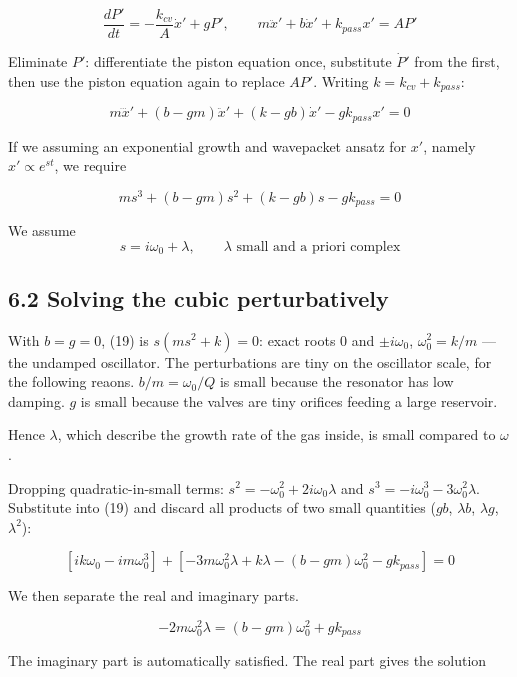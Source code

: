 \documentclass[11pt]{article}
\begin{document}
\begin{equation}
\frac{dP'}{dt} = -\frac{k_{cv}}{A}\dot x' + gP', \qquad m\ddot x' + b\dot x' + k_{pass}x' = AP' \tag{18}
\end{equation}

Eliminate $P'$: differentiate the piston equation once, substitute $\dot P'$ from the first, then use the piston equation again to replace $AP'$. Writing $k = k_{cv}+k_{pass}$:

\[
m\dddot x' + (b - gm)\ddot x' + (k - gb)\dot x' - gk_{pass}x' = 0
\]

If we assuming an exponential growth and wavepacket ansatz for $x'$, namely $x' \propto e^{st}$, we require

\begin{equation}
ms^3 + (b - gm)s^2 + (k - gb)s - gk_{pass} = 0 \tag{19}
\end{equation}

We assume
\[
s = i\omega_0 + \lambda, \qquad \lambda \text{ small and a priori complex}
\]

\subsection*{6.2 Solving the cubic perturbatively}

With $b = g = 0$, (19) is $s(ms^2 + k) = 0$: exact roots $0$ and $\pm i\omega_0$, $\omega_0^2 = k/m$ --- the undamped oscillator. The perturbations are tiny on the oscillator scale, for the following reaons. $b/m = \omega_0/Q$ is small because the resonator has low damping. $g$ is small because the valves are tiny orifices feeding a large reservoir.

Hence $\lambda$, which describe the growth rate of the gas inside, is small compared to $\omega$.

Dropping quadratic-in-small terms: $s^2 = -\omega_0^2 + 2i\omega_0\lambda$ and $s^3 = -i\omega_0^3 - 3\omega_0^2\lambda$. Substitute into (19) and discard all products of two small quantities ($gb$, $\lambda b$, $\lambda g$, $\lambda^2$):

\[
\left[ik\omega_0 - im\omega_0^3\right] + \left[-3m\omega_0^2\lambda + k\lambda - (b - gm)\omega_0^2 - gk_{pass}\right] = 0
\]

We then separate the real and imaginary parts.

\[
-2m\omega_0^2\lambda = (b - gm)\omega_0^2 + gk_{pass}
\]

The imaginary part is automatically satisfied. The real part gives the solution
\end{document}
